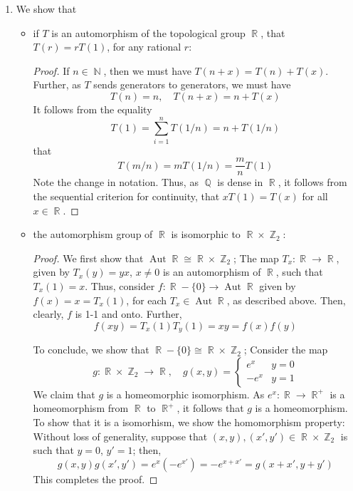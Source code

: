 \documentclass{book}
\DeclareMathOperator*{\Q}{\mathbb{Q}}
\DeclareMathOperator*{\R}{\mathbb{R}}
\DeclareMathOperator*{\N}{\mathbb{N}}
\DeclareMathOperator*{\Aut}{\text{Aut}}
\DeclareMathOperator*{\Z}{\mathbb{Z}}
\begin{document}
\begin{enumerate}[(1)]
    \item We show that  
        \begin{itemize}
            \item if $T$ is an automorphism of the topological group $\R$, that $T(r) = rT(1)$, for any rational $r$:
                \begin{proof} If $n \in \N$, then we must have $T(n + x) = T(n) + T(x)$. Further, as $T$ sends generators to generators, we must have 
                    \[T(n) = n, \quad T(n + x) = n + T(x)\]
                    It follows from the equality 
                    \[T(1) = \sum_{i = 1}^n T(1/n) = n + T(1/n)\]
                    that 
                    \[T(m/n) = m T(1/n) = \frac{m}{n} T(1)\]
                    Note the change in notation. 
                    Thus, as $\Q$ is dense in $\R$, it follows from the sequential criterion for continuity, that $xT(1) = T(x)$ for all $x \in \R$.
                \end{proof}
            \item the automorphism group of $\R$ is isomorphic to $\R \times \Z_2$:
                \begin{proof} We first show that $\Aut \R \cong \R \times \Z_2$; The map $T_x: \R \rightarrow \R$, given by $T_x(y) = yx$, $x \neq 0$ is an automorphism of $\R$, such that $T_x(1) = x$. Thus, consider $f: \R - \{0\} \rightarrow \Aut \R$ given by $f(x) = x = T_x(1)$, for each $T_x \in \Aut \R$, as described above. Then, clearly, $f$ is 1-1 and onto. Further, 
                    \[f(xy) = T_x(1) T_y(1) = xy = f(x)f(y)\]
                    \par To conclude, we show that $\R - \{0\} \cong \R \times \Z_2$; Consider the map 
                    \[g: \R \times \Z_2 \rightarrow \R, \quad 
                    g(x,y) = 
                    \begin{cases}
                        e^x & y = 0 \\
                        -e^x & y =1
                    \end{cases}
                    \]
                    We claim that $g$ is a homeomorphic isomorphism. As $e^x: \R \rightarrow \R^+$ is a homeomorphism from $\R$ to $\R^+$, it follows that $g$ is a homeomorphism. To show that it is a isomorhism, we show the homomorphism property: 
                    Without loss of generality, suppose that $(x,y), (x',y') \in \R \times \Z_2$ is such that $y = 0$, $y' = 1$; then, 
                    \[g(x,y)g(x',y') = e^x(-e^{x'}) = -e^{x + x'} = g(x + x', y + y')\]
                    This completes the proof. 
                \end{proof}
        \end{itemize}


\end{enumerate}
\end{document}
